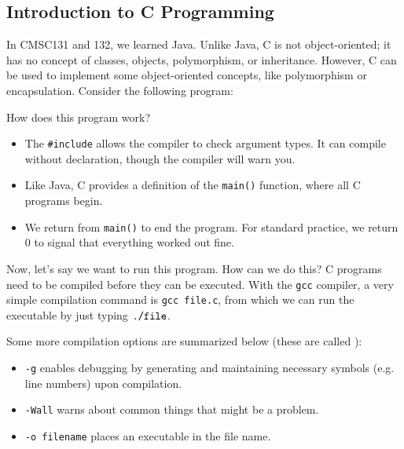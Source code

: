 \subsection{Introduction to C Programming}
In CMSC131 and 132, we learned Java. Unlike Java, C is not object-oriented; it has no concept of classes, objects, polymorphism, or inheritance. However, C can be used to implement some object-oriented concepts, like polymorphism or encapsulation. Consider the following program: 


\lstset{
caption=A First Program
}


How does this program work? 
\begin{itemize}
    \item The \verb!#include! allows the compiler to check argument types. It can compile without declaration, though the compiler will warn you. 
    \item Like Java, C provides a definition of the \verb!main()! function, where all C programs begin. 
    \item We return from \verb!main()! to end the program. For standard practice, we return $0$ to signal that everything worked out fine. 
\end{itemize}

Now, let's say we want to run this program. How can we do this? C programs need to be compiled before they can be executed. With the \verb!gcc! compiler, a very simple compilation command is \verb!gcc file.c!, from which we can run the executable by just typing $\verb!./file!$. 

Some more compilation options are summarized below (these are called ): \begin{itemize}
    \item \verb!-g! enables debugging by generating and maintaining necessary symbols (e.g. line numbers) upon compilation.
    \item \verb!-Wall! warns about common things that might be a problem.
    \item \verb!-o filename! places an executable in the file name.
\end{itemize}